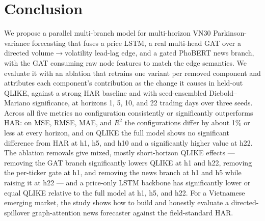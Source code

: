 \documentclass[runningheads]{llncs}
\begin{document}
\section{Conclusion}
\label{sec:conclusion}
We propose a parallel multi-branch model for multi-horizon VN30 Parkinson-variance forecasting that fuses a
price LSTM, a real multi-head GAT over a directed volume$\to$volatility lead-lag edge, and a gated PhoBERT
news branch, with the GAT consuming raw node features to match the edge semantics. We evaluate it with an
ablation that retrains one variant per removed component and attributes each component's contribution as the
change it causes in held-out QLIKE, against a strong HAR baseline and with seed-ensembled Diebold--Mariano
significance, at horizons 1, 5, 10, and 22 trading days over three seeds. Across all five metrics no
configuration consistently or significantly outperforms HAR: on MSE, RMSE, MAE, and $R^2$ the
configurations differ by about 1\% or less at every horizon, and on QLIKE the full model shows no
significant difference from HAR at h1, h5, and h10 and a significantly higher value at h22. The ablation
removals give mixed, mostly short-horizon QLIKE effects --- removing the GAT branch significantly lowers
QLIKE at h1 and h22, removing the per-ticker gate at h1, and removing the news branch at h1 and h5 while
raising it at h22 --- and a price-only LSTM backbone has significantly lower or equal QLIKE relative to the
full model at h1, h5, and h22. For a Vietnamese emerging market, the study shows how to build and honestly evaluate a
directed-spillover graph-attention news forecaster against the field-standard HAR.
\end{document}
